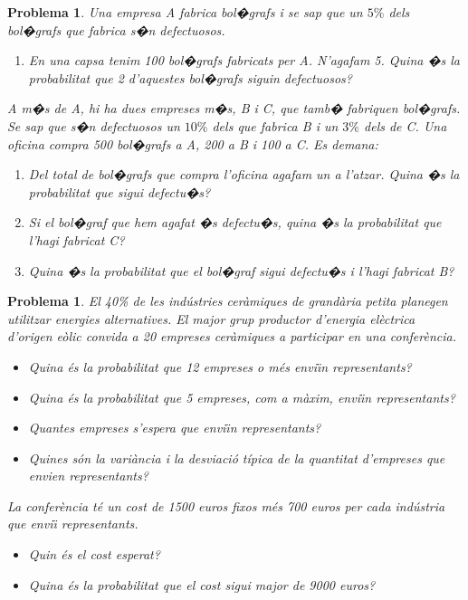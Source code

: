 \documentclass[a4paper,10pt]{article}
\newcounter{prbcont}
\newtheorem{problema}[prbcont]{Problema}
\begin{document}
\newpage

\begin{problema}
Una empresa A fabrica bol�grafs i se sap que un $5\%$ dels bol�grafs que fabrica
s�n defectuosos.

\begin{enumerate}
\item[a)] En una capsa tenim 100 bol�grafs fabricats per A. N'agafam 5.
Quina �s la probabilitat que 2 d'aquestes bol�grafs siguin defectuosos?
\end{enumerate}

A m�s de A, hi ha dues empreses m�s, B i C, que tamb� fabriquen bol�grafs. 
Se sap que s�n defectuosos un $10\%$ dels que fabrica B i un $3\%$
dels de C. Una oficina compra 500 bol�grafs a A, 200 a B i 100 a C.
Es demana:

\begin{enumerate}
\item[b)] Del total de bol�grafs que compra l'oficina agafam un a l'atzar.
Quina �s la probabilitat que sigui defectu�s?
\item[c)] Si el bol�graf que hem agafat �s defectu�s, quina �s la probabilitat
que l'hagi fabricat C?
\item[d)] Quina �s la probabilitat que el bol�graf sigui defectu�s i l'hagi
fabricat B?
\end{enumerate}
\end{problema}


\vskip 1cm
\begin{problema}
El 40\% de les ind\'ustries cer\`amiques de grand\`aria petita planegen utilitzar energies alternatives. El major grup productor d'energia el\`ectrica d'origen e\`olic convida a 20 empreses cer\`amiques a participar en una confer\`encia.
\begin{itemize}
\item [a)] Quina \'es la probabilitat que 12 empreses o m\'es envi\"{\i}n representants?
\item [b)] Quina \'es la probabilitat que 5 empreses, com a m\`axim, envi\"{\i}n representants?
\item [c)] Quantes empreses s'espera que envi\"{\i}n representants?
\item [d)] Quines s\'on la vari\`ancia i la desviaci\'o t\'ipica de la quantitat d'empreses que envien representants?
\end{itemize}
La confer\`encia t\'e un cost de 1500 euros fixos m\'es 700 euros per cada ind\'ustria que envi\"{\i} representants. 
\begin{itemize}
\item  [e)] Quin \'es el cost esperat? 
\item [f)] Quina \'es la probabilitat que el cost sigui major de 9000 euros?
\end{itemize}
\end{problema}
\end{document}
